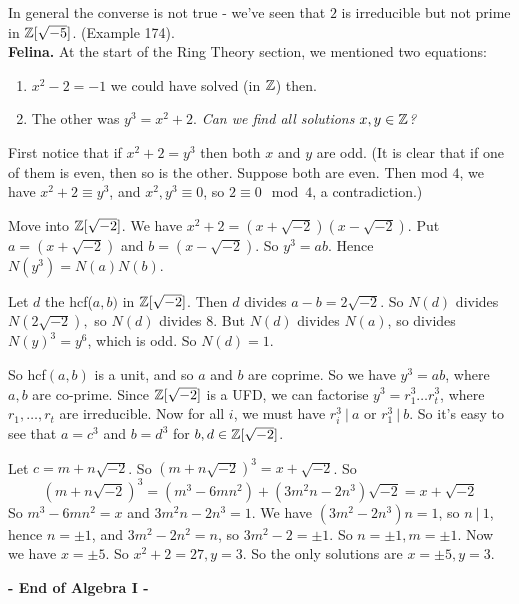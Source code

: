 In general the converse is not true - we've seen that $2$ is irreducible but not prime in $\mathbb{Z}[\sqrt{-5}]$. (Example 174).\\

\textbf{Felina.} At the start of the Ring Theory section, we mentioned two equations:\begin{enumerate}

\item $x^2 -2 = -1$ we could have solved (in $\mathbb{Z}$) then.
 
\item  The other was $y^3 = x^2 + 2$. \textit{ Can we find all solutions $x,y \in \mathbb{Z}$?}
  \end{enumerate}\vspace*{5pt}
  
  First notice that if $x^2 +2 = y^3$ then both $x$ and $y$ are odd. (It is clear that if one of them is even, then so is the other. Suppose both are even. Then mod $4$, we have $x^2 + 2 \equiv y^3$, and $x^2,y^3 \equiv 0$, so $2 \equiv 0 \mod 4$, a contradiction.)
  
 Move into $\mathbb{Z}[\sqrt{-2}]$. We have $x^2 +2 = (x + \sqrt{-2})(x-\sqrt{-2})$. Put $a = (x+\sqrt{-2})$ and $b = (x-\sqrt{-2}).$ So $y^3 = ab$. Hence $N(y^3) = N(a)N(b).$
 
  Let $d$ the hcf($a,b)$ in $\mathbb{Z}[\sqrt{-2}]$. Then $d$ divides $a-b = 2\sqrt{-2}$. So $N(d)$ divides $N(2\sqrt{-2}),$ so $N(d) $ divides $8$. But $N(d)$ divides $N(a)$, so divides $N(y)^3 = y^6$, which is odd. So $N(d) = 1$.
 
  So hcf$(a,b)$ is a unit, and so $a$ and $b$ are coprime. So we have $y^3 = ab$, where $a,b$ are co-prime. Since $\mathbb{Z}[\sqrt{-2}]$ is a UFD, we can factorise $y^3 = r_1^3 \dots r_t^3$, where $r_1,\dots,r_t$ are irreducible. Now for all $i$, we must have $r_i^3 ~|~ a$ or $r_1^3 ~|~ b$. So it's easy to see that $a=c^3$ and $b = d^3$ for $b,d \in \mathbb{Z}[\sqrt{-2}]$. 
  
  Let $c = m+n\sqrt{-2}$. So $(m + n\sqrt{-2})^3 = x + \sqrt{-2}$. So
  \[(m + n\sqrt{-2})^3  = (m^3 -6mn^2) + (3m^2n-2n^3)\sqrt{-2} = x+\sqrt{-2}\]
  So $m^3 - 6mn^2 = x$ and $3m^2n - 2n^3 = 1$. We have $(3m^2 - 2n^3)n = 1$, so $n~|~1$, hence $n = \pm 1$, and $3m^2 - 2n^2 = n$, so $3m^2 - 2 =\pm 1$. So $n = \pm 1, m = \pm 1$. Now we have $x = \pm 5$. So $x^2 + 2 = 27, y = 3$. So the only solutions are $x = \pm 5, y = 3$.
  
  
  \begin{center}
  
  \textsf{\textbf{- End of Algebra I -}}	
  \end{center}


 